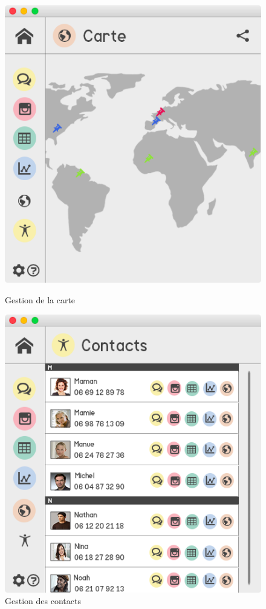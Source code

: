 \documentclass[11pt]{article}
\begin{document}
\begin{figure}[hbtp]
    \begin{minipage}[b]{0.4\linewidth}
        \centering \includegraphics[scale=0.43]{Modelisation/carte.png}
        \caption{Gestion de la carte}
                \label{fig:carte}
\label{fig:base}
    \end{minipage}\hfill
    \begin{minipage}[b]{0.48\linewidth}
        \centering \includegraphics[scale=0.43]{Modelisation/contact.png}
        \caption{Gestion des contacts}
         \label{fig:contact}
    \end{minipage}
\end{figure}
\end{document}
